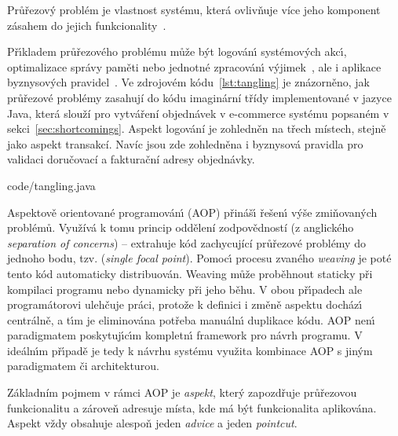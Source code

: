 \begin{definition}
    Průřezový problém je vlastnost systému, která ovlivňuje více jeho komponent
    zásahem do jejich funkcionality~\cite{kiczales1997aspect}.
\end{definition}

Př\'{\i}kladem průřezového problému může b\'yt logován\'{\i}
systémov\'ych akc\'{\i}, optimalizace správy paměti
nebo jednotné zpracován\'{\i} v\'yjimek~\cite{kiczales1997aspect},
ale i aplikace byznysových pravidel~\cite{cemus2014aspect}.
Ve zdrojovém kódu~\ref{lst:tangling} je znázorněno, jak průřezové
problémy zasahují do kódu imaginární třídy implementované v
jazyce Java, která slouží pro vytváření objednávek v e-commerce
systému popsaném v sekci~\ref{sec:shortcomings}.
Aspekt logování je zohledněn na třech místech, stejně jako aspekt transakcí.
Navíc jsou zde zohledněna i byznysová pravidla pro validaci doručovací
a fakturační adresy objednávky.


{code/tangling.java}

Aspektově orientované programován\'{\i} (\gls{AOP}) přináš\'{\i} řešen\'{\i}
v\'yše zmiňovaných problémů. Využívá k tomu princip oddělení zodpovědností (z anglického \textit{separation
of concerns}) -- extrahuje kód zachycující průřezové problémy do jednoho bodu, tzv. (\textit{single focal point}).
Pomoc\'{\i} procesu zvaného \textit{weaving} je poté tento kód automaticky distribuován.
Weaving může proběhnout staticky při kompilaci programu nebo dynamicky
při jeho běhu. V obou př\'{\i}padech ale programátorovi ulehčuje práci,
protože k definici i změně aspektu docház\'{\i} centrálně, a t\'{\i}m je eliminována
potřeba manuáln\'{\i} duplikace kódu. \gls{AOP} nen\'{\i} paradigmatem poskytuj\'{\i}c\'{\i}m
kompletn\'{\i} framework pro návrh programu. V ideáln\'{\i}m př\'{\i}padě je tedy k návrhu
systému využita kombinace \gls{AOP} s jin\'ym paradigmatem či architekturou.

Základním pojmem v rámci \gls{AOP} je \textit{aspekt},
který zapozdřuje průřezovou funkcionalitu a zároveň adresuje místa, kde má být
funkcionalita aplikována. Aspekt vždy obsahuje alespoň jeden \textit{advice}
a jeden \textit{pointcut}.

